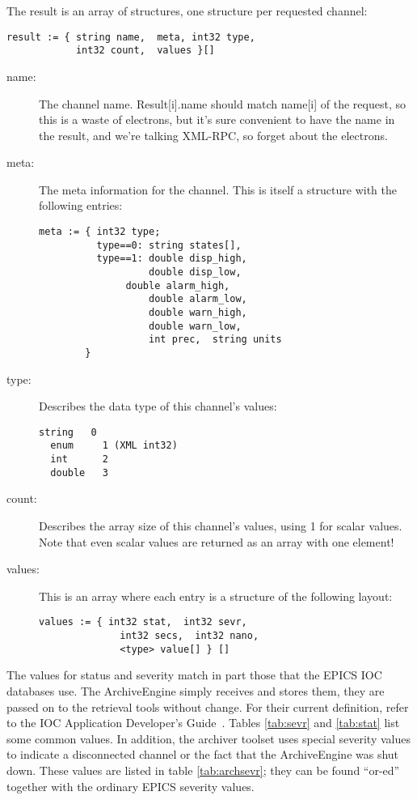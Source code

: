 \noindent The result is an array of structures,  one structure per
requested channel:

\begin{lstlisting}[keywordstyle=\sffamily]
result := { string name,  meta, int32 type,
            int32 count,  values }[]
\end{lstlisting}

\begin{description}
\item[\sffamily name:]
   The channel name.
   Result[i].name should match name[i] of the request, 
   so this is a waste of electrons,  but it's sure convenient
   to have the name in the result,  and we're talking XML-RPC,
   so forget about the electrons.
\item[\sffamily meta:]
   The meta information for the channel. This is itself a structure 
   with the following entries:
   \begin{lstlisting}[keywordstyle=\sffamily]
meta := { int32 type;
          type==0: string states[], 
          type==1: double disp_high, 
                   double disp_low, 
	           double alarm_high, 
                   double alarm_low, 
                   double warn_high, 
                   double warn_low, 
                   int prec,  string units
        }
   \end{lstlisting}
\item[\sffamily type:]
   Describes the data type of this channel's values:
  \begin{lstlisting}[frame=none, keywordstyle=\sffamily]
  string   0
  enum	   1 (XML int32)
  int      2
  double   3
  \end{lstlisting}
\item[\sffamily count:]
  Describes the array size of this channel's values,  using 1 for
  scalar values. Note that even scalar values are returned as an array
  with one element!
\item[\sffamily values:]
  This is an array where each entry is a structure of the following
  layout:
  \begin{lstlisting}[frame=none, keywordstyle=\sffamily]
  values := { int32 stat,  int32 sevr,
              int32 secs,  int32 nano,
              <type> value[] } []
  \end{lstlisting}
\end{description}

\noindent The values for status and severity match in part those that
the EPICS IOC databases use. The ArchiveEngine simply receives and
stores them, they are passed on to the retrieval tools without
change. For their current definition, refer to the IOC Application
Developer's Guide~\cite{iocappdev04}. Tables \ref{tab:sevr} and
\ref{tab:stat} list some common values.  In addition, the archiver
toolset uses special severity values to indicate a disconnected
channel or the fact that the ArchiveEngine was shut down. These values
are listed in table \ref{tab:archsevr}; they can be found ``or-ed''
together with the ordinary EPICS severity values.


